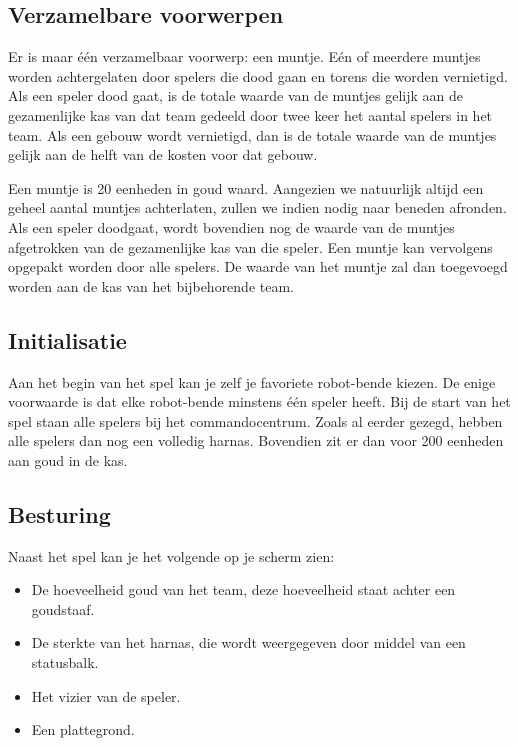     \subsection{Verzamelbare voorwerpen}
    Er is maar \'e\'en verzamelbaar voorwerp: een muntje. E\'en of meerdere muntjes worden achtergelaten door spelers die dood gaan en torens die worden vernietigd. Als een speler dood gaat, is de totale waarde van de muntjes gelijk aan de gezamenlijke kas van dat team gedeeld door twee keer het aantal spelers in het team. Als een gebouw wordt vernietigd, dan is de totale waarde van de muntjes gelijk aan de helft van de kosten voor dat gebouw. 
    
    Een muntje is 20 eenheden in goud waard. Aangezien we natuurlijk altijd een geheel aantal muntjes achterlaten, zullen we indien nodig naar beneden afronden. Als een speler doodgaat, wordt bovendien nog de waarde van de muntjes afgetrokken van de gezamenlijke kas van die speler. Een muntje kan vervolgens opgepakt worden door alle spelers. De waarde van het muntje zal dan toegevoegd worden aan de kas van het bijbehorende team.

    \subsection{Initialisatie}
    Aan het begin van het spel kan je zelf je favoriete robot-bende kiezen. De enige voorwaarde is dat elke robot-bende minstens \'e\'en speler heeft. Bij de start van het spel staan alle spelers bij het commandocentrum. Zoals al eerder gezegd, hebben alle spelers dan nog een volledig harnas. Bovendien zit er dan voor 200 eenheden aan goud in de kas.
    \FloatBarrier

    \subsection{Besturing}
    \label{sec:UI}

    Naast het spel kan je het volgende op je scherm zien:
    \begin{itemize}
    \item De hoeveelheid goud van het team, deze hoeveelheid staat achter een goudstaaf.
    \item De sterkte van het harnas, die wordt weergegeven door middel van een statusbalk.
    \item Het vizier van de speler.
    \item Een plattegrond.
    \end{itemize}

